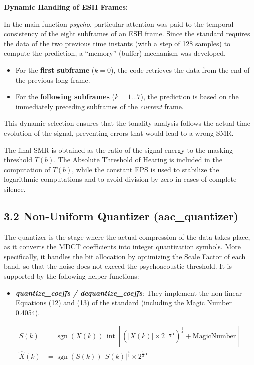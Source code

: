 \documentclass[11pt,twocolumn]{article}
\newcommand{\fn}[1]{\textit{#1}}
\newcommand{\sub}[1]{\subsection*{#1}}
\begin{document}
\textbf{Dynamic Handling of ESH Frames:}

In the main function \fn{psycho}, particular attention was paid to the temporal consistency of the eight subframes of an ESH frame. Since the standard requires the data of the two previous time instants (with a step of 128 samples) to compute the prediction, a ``memory'' (buffer) mechanism was developed.
\begin{itemize}
  \item For the \textbf{first subframe} ($k=0$), the code retrieves the data from the end of the previous long frame.
  \item For the \textbf{following subframes} ($k=1\ldots7$), the prediction is based on the immediately preceding subframes of the \textit{current} frame.
\end{itemize}
This dynamic selection ensures that the tonality analysis follows the actual time evolution of the signal, preventing errors that would lead to a wrong SMR.

The final SMR is obtained as the ratio of the signal energy to the masking threshold $T(b)$. The Absolute Threshold of Hearing is included in the computation of $T(b)$, while the constant EPS is used to stabilize the logarithmic computations and to avoid division by zero in cases of complete silence.

\sub{3.2 Non-Uniform Quantizer (aac\_quantizer)}
The quantizer is the stage where the actual compression of the data takes place, as it converts the MDCT coefficients into integer quantization symbols. More specifically, it handles the bit allocation by optimizing the Scale Factor of each band, so that the noise does not exceed the psychoacoustic threshold. It is supported by the following helper functions:
\begin{itemize}[label=$\blacktriangleright$]
  \item \textbf{\fn{quantize\_coeffs / dequantize\_coeffs}}: They implement the non-linear Equations (12) and (13) of the standard (including the Magic Number 0.4054).
\end{itemize}
{\footnotesize
\begin{align}
S(k) &= \operatorname{sgn}(X(k))\,\operatorname{int}\!\left[\left(|X(k)|\times2^{-\frac{1}{4}\alpha}\right)^{\frac{3}{4}}+\text{MagicNumber}\right] \tag{12}\\
\hat{X}(k) &= \operatorname{sgn}(S(k))\,|S(k)|^{\frac{4}{3}}\times2^{\frac{1}{4}\alpha} \tag{13}
\end{align}
}
\end{document}
